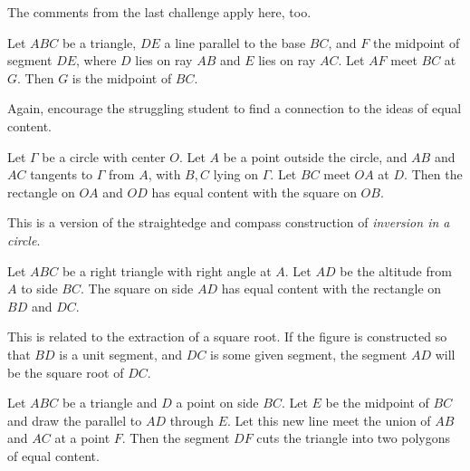 \begin{annotation}
{
\color{blue}
The comments from the last challenge apply here, too.
}
\end{annotation}

\begin{conjecture}\label{conj:content-triangle}
Let $ABC$ be a triangle, $DE$ a line parallel to the base $BC$, and $F$ the midpoint of segment $DE$, where $D$ lies on ray $AB$ and $E$ lies on ray $AC$. Let $AF$ meet $BC$ at $G$. Then $G$ is the midpoint of $BC$.
\end{conjecture}

\begin{annotation}
{
\color{blue}
Again, encourage the struggling student to find a connection to the ideas of equal content. 
}
\end{annotation}

\begin{conjecture}\label{conj:content-circle}
Let $\Gamma$ be a circle with center $O$. Let $A$ be a point outside the circle, and $AB$ and $AC$ tangents to $\Gamma$ from $A$, with $B, C$ lying on $\Gamma$. Let $BC$ meet $OA$ at $D$. Then the rectangle on $OA$ and $OD$ has equal content with the square on $OB$.
\end{conjecture}

\begin{annotation}
{
\color{blue}
This is a version of the straightedge and compass construction of \emph{inversion in a circle}.
}
\end{annotation}

\begin{conjecture}\label{conj:right-triangle-similarity}
Let $ABC$ be a right triangle with right angle at $A$. Let $AD$ be the altitude from $A$ to side $BC$. The square on side $AD$ has equal content with the rectangle on $BD$ and $DC$.
\end{conjecture}

\begin{annotation}
{
\color{blue}
This is related to the extraction of a square root. If the figure is constructed so that $BD$ is a unit segment, and $DC$ is some given segment, the segment $AD$ will be the square root of $DC$.
}
\end{annotation}

\begin{conjecture}\label{conj:divide-triangle}
Let $ABC$ be a triangle and $D$ a point on side $BC$. Let $E$ be the midpoint of $BC$ and draw the parallel to $AD$ through $E$. Let this new line meet the union of $AB$ and $AC$ at a point $F$. Then the segment $DF$ cuts the triangle into two polygons of equal content.
\end{conjecture}

